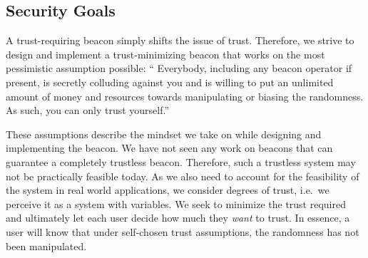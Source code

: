 \subsection{Security Goals}\label{sec:security_goals}
A trust-requiring beacon simply shifts the issue of trust.
Therefore, we strive to design and implement a trust-minimizing beacon that works on the most pessimistic assumption possible:
\enquote{%
Everybody, including any beacon operator if present, is secretly colluding against you and is willing to put an unlimited amount of money and resources towards manipulating or biasing the randomness.
As such, you can only trust yourself.}

These assumptions describe the mindset we take on while designing and implementing the beacon.
We have not seen any work on beacons that can guarantee a completely trustless beacon.
Therefore, such a trustless system may not be practically feasible today.
As we also need to account for the feasibility of the system in real world applications, we consider degrees of trust, i.e.\ we perceive it as a system with variables.
We seek to minimize the trust required and ultimately let each user decide how much they \emph{want} to trust.
In essence, a user will know that under self-chosen trust assumptions, the randomness has not been manipulated.

